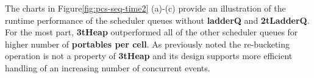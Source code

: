 The charts in Figure\ref{fig:pcs-seq-time2} (a)-(c) provide an illustration of the runtime performance of the scheduler queues without \textbf{ladderQ} and \textbf{2tLadderQ}. For the most part, \textbf{3tHeap} outperformed all of the other scheduler queues for higher number of \textbf{portables per cell}. As previously noted the re-bucketing operation is not a property of \textbf{3tHeap} and its design supports more efficient handling of an increasing number of concurrent events. 

\begin{figure}
\end{figure}
